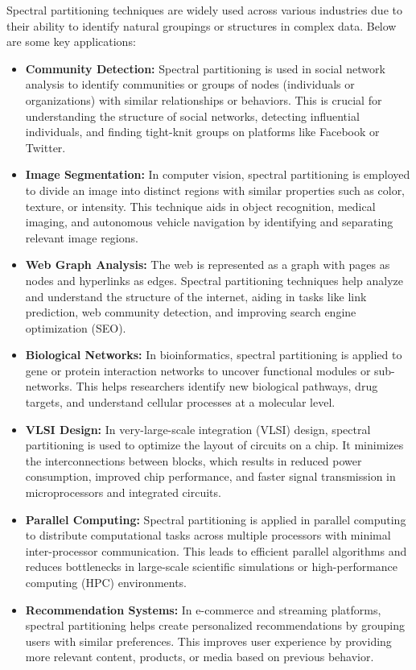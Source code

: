 \documentclass[hidelinks,12pt]{article}
\begin{document}
Spectral partitioning techniques are widely used across various industries due to their ability to identify natural groupings or structures in complex data. Below are some key applications:

\begin{itemize}
    \item \textbf{Community Detection:} Spectral partitioning is used in social network analysis to identify communities or groups of nodes (individuals or organizations) with similar relationships or behaviors. This is crucial for understanding the structure of social networks, detecting influential individuals, and finding tight-knit groups on platforms like Facebook or Twitter.
    
    \item \textbf{Image Segmentation:} In computer vision, spectral partitioning is employed to divide an image into distinct regions with similar properties such as color, texture, or intensity. This technique aids in object recognition, medical imaging, and autonomous vehicle navigation by identifying and separating relevant image regions.
    
    \item \textbf{Web Graph Analysis:} The web is represented as a graph with pages as nodes and hyperlinks as edges. Spectral partitioning techniques help analyze and understand the structure of the internet, aiding in tasks like link prediction, web community detection, and improving search engine optimization (SEO).
    
    \item \textbf{Biological Networks:} In bioinformatics, spectral partitioning is applied to gene or protein interaction networks to uncover functional modules or sub-networks. This helps researchers identify new biological pathways, drug targets, and understand cellular processes at a molecular level.
    
    \item \textbf{VLSI Design:} In very-large-scale integration (VLSI) design, spectral partitioning is used to optimize the layout of circuits on a chip. It minimizes the interconnections between blocks, which results in reduced power consumption, improved chip performance, and faster signal transmission in microprocessors and integrated circuits.
    
    \item \textbf{Parallel Computing:} Spectral partitioning is applied in parallel computing to distribute computational tasks across multiple processors with minimal inter-processor communication. This leads to efficient parallel algorithms and reduces bottlenecks in large-scale scientific simulations or high-performance computing (HPC) environments.
    
    \item \textbf{Recommendation Systems:} In e-commerce and streaming platforms, spectral partitioning helps create personalized recommendations by grouping users with similar preferences. This improves user experience by providing more relevant content, products, or media based on previous behavior.
\end{itemize}
\newpage
\end{document}
